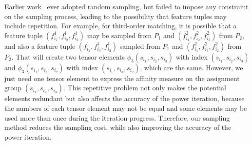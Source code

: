 Earlier work~\cite{Duchenne09,Zass08} ever adopted random sampling,
but failed to impose any constraint on the sampling process,
leading to the possibility that feature tuples may include repetition.
For example, for third-order matching, it is possible that a feature tuple $(f_{i_1}^1, f_{i_2}^1, f_{i_3}^1)$ may be sampled from $P_1$ and $(f_{i_1}^2, f_{i_2}^2, f_{i_3}^2)$ from $P_2$, and also a feature tuple $(f_{i_1}^1, f_{i_3}^1, f_{i_2}^1)$ sampled from $P_1$ and $(f_{i_1}^2, f_{i_3}^2, f_{i_2}^2)$ from $P_2$. That will create two tensor elements $\phi_3(s_{i_1}, s_{i_2}, s_{i_3})$ with index $(s_{i_1}, s_{i_2}, s_{i_3})$ and $\phi_3(s_{i_1}, s_{i_3}, s_{i_2})$ with index $(s_{i_1}, s_{i_3}, s_{i_2})$, which are the same. However, we just need one tensor element to express the affinity measure on the assignment group $(s_{i_1}, s_{i_2}, s_{i_3})$.
This repetitive problem not only makes the potential elements redundant but also affects the accuracy of the power iteration,
because the numbers of each tensor element may not be equal and some elements may be used more than once during the iteration progress.
Therefore, our sampling method reduces the sampling cost, while also improving the accuracy of the power iteration.
